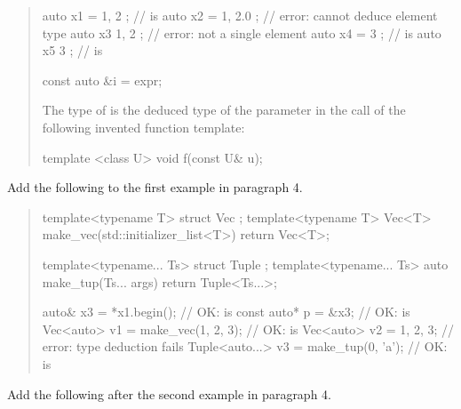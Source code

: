 \begin{quote}
\enterexample
\begin{codeblock}
auto x1 = { 1, 2 };             //  is 
auto x2 = { 1, 2.0 };           // error: cannot deduce element type
auto x3{ 1, 2 };                // error: not a single element
auto x4 = { 3 };                //  is 
auto x5{ 3 };                   //  is 
\end{codeblock}
\exitexample

\enterexample
\begin{codeblock}
const auto &i = expr;
\end{codeblock}
The type of  is the deduced type of the parameter  in
the call  of the following invented function template:
\begin{codeblock}
template <class U> void f(const U& u);
\end{codeblock}
\exitexample
\end{quote}

Add the following to the first example in paragraph 4.

\begin{quote}
\begin{addedblock}
\enterexample
\begin{codeblock}
template<typename T> struct Vec { };
template<typename T> Vec<T> make_vec(std::initializer_list<T>) { return Vec<T>{}; }

template<typename... Ts> struct Tuple { };
template<typename... Ts> auto make_tup(Ts... args) { return Tuple<Ts...>{}; }

auto& x3 = *x1.begin();               // OK:  is 
const auto* p = &x3;                  // OK:  is 
Vec<auto> v1 = make_vec({1, 2, 3});   // OK:  is 
Vec<auto> v2 = {1, 2, 3};             // error: type deduction fails
Tuple<auto...> v3 = make_tup(0, 'a'); // OK:  is 
\end{codeblock}
\exitexample
\end{addedblock}
\end{quote}


Add the following after the second example in paragraph 4.

